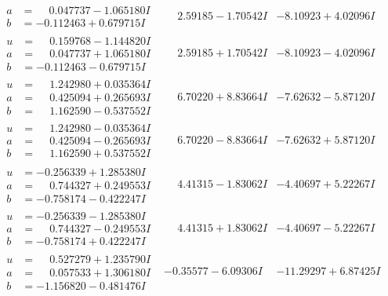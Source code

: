 \documentclass[1p]{elsarticle_modified}
\theoremstyle{definition}
\begin{document}
$$\begin{array}{c|c|c}
\begin{aligned}
a &= \phantom{-}0.047737 - 1.065180 I \\
b &= -0.112463 + 0.679715 I\end{aligned}
 & \phantom{-}2.59185 - 1.70542 I & -8.10923 + 4.02096 I \\ \hline\begin{aligned}
u &= \phantom{-}0.159768 - 1.144820 I \\
a &= \phantom{-}0.047737 + 1.065180 I \\
b &= -0.112463 - 0.679715 I\end{aligned}
 & \phantom{-}2.59185 + 1.70542 I & -8.10923 - 4.02096 I \\ \hline\begin{aligned}
u &= \phantom{-}1.242980 + 0.035364 I \\
a &= \phantom{-}0.425094 + 0.265693 I \\
b &= \phantom{-}1.162590 - 0.537552 I\end{aligned}
 & \phantom{-}6.70220 + 8.83664 I & -7.62632 - 5.87120 I \\ \hline\begin{aligned}
u &= \phantom{-}1.242980 - 0.035364 I \\
a &= \phantom{-}0.425094 - 0.265693 I \\
b &= \phantom{-}1.162590 + 0.537552 I\end{aligned}
 & \phantom{-}6.70220 - 8.83664 I & -7.62632 + 5.87120 I \\ \hline\begin{aligned}
u &= -0.256339 + 1.285380 I \\
a &= \phantom{-}0.744327 + 0.249553 I \\
b &= -0.758174 - 0.422247 I\end{aligned}
 & \phantom{-}4.41315 - 1.83062 I & -4.40697 + 5.22267 I \\ \hline\begin{aligned}
u &= -0.256339 - 1.285380 I \\
a &= \phantom{-}0.744327 - 0.249553 I \\
b &= -0.758174 + 0.422247 I\end{aligned}
 & \phantom{-}4.41315 + 1.83062 I & -4.40697 - 5.22267 I \\ \hline\begin{aligned}
u &= \phantom{-}0.527279 + 1.235790 I \\
a &= \phantom{-}0.057533 + 1.306180 I \\
b &= -1.156820 - 0.481476 I\end{aligned}
 & -0.35577 - 6.09306 I & -11.29297 + 6.87425 I \\ \hline\begin{aligned}

\end{aligned}
\end{array}$$
\end{document}

